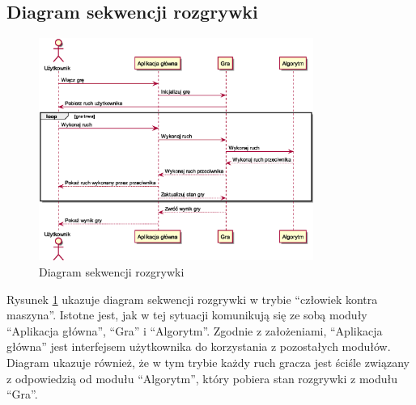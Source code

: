 \documentclass{article}
\begin{document}
	\subsection{Diagram sekwencji rozgrywki}
	\begin{figure}[h]
		\centering
		\includegraphics[width=0.8\textwidth]{play_with_pc_sequence}
		\caption{Diagram sekwencji rozgrywki}
		\label{rys:sequencegame}
	\end{figure}
	\noindent Rysunek \ref{rys:sequencegame} ukazuje diagram sekwencji rozgrywki w trybie ``człowiek kontra maszyna''. Istotne jest, jak w tej sytuacji komunikują się ze sobą moduły ``Aplikacja główna'', ``Gra'' i ``Algorytm''. Zgodnie z założeniami, ``Aplikacja główna'' jest interfejsem użytkownika do korzystania z pozostałych modułów.\\
	
	\noindent Diagram ukazuje również, że w tym trybie każdy ruch gracza jest ściśle związany z odpowiedzią od modułu ``Algorytm'', który pobiera stan rozgrywki z modułu ``Gra''.
	
	\clearpage
\end{document}
